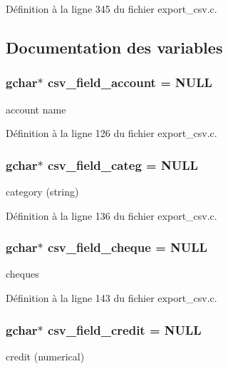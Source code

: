 Définition à la ligne 345 du fichier export\_\-csv.c.



\subsection{Documentation des variables}
\subsubsection[{csv\_\-field\_\-account}]{\setlength{\rightskip}{0pt plus 5cm}gchar$\ast$ {\bf csv\_\-field\_\-account} = NULL}\label{export__csv_8c_a325e4860f1402756454158d9310d9b30}
account name 

Définition à la ligne 126 du fichier export\_\-csv.c.

\subsubsection[{csv\_\-field\_\-categ}]{\setlength{\rightskip}{0pt plus 5cm}gchar$\ast$ {\bf csv\_\-field\_\-categ} = NULL}\label{export__csv_8c_a043f91f6ccd82c1d9022d8c23e7dd23a}
category (string) 

Définition à la ligne 136 du fichier export\_\-csv.c.

\subsubsection[{csv\_\-field\_\-cheque}]{\setlength{\rightskip}{0pt plus 5cm}gchar$\ast$ {\bf csv\_\-field\_\-cheque} = NULL}\label{export__csv_8c_aeda55bf30234222847badb514022ccfd}
cheques 

Définition à la ligne 143 du fichier export\_\-csv.c.

\subsubsection[{csv\_\-field\_\-credit}]{\setlength{\rightskip}{0pt plus 5cm}gchar$\ast$ {\bf csv\_\-field\_\-credit} = NULL}\label{export__csv_8c_a0849982d137c0d924a57227442e85225}
credit (numerical) 

